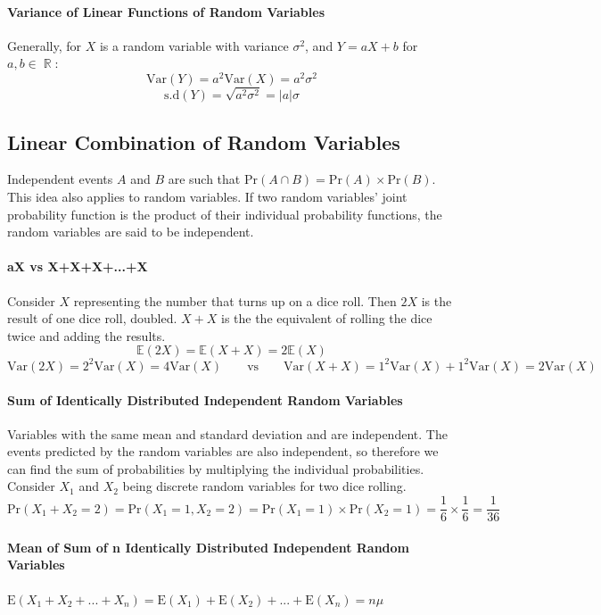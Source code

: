 \documentclass[a4paper,twoside]{article}
\DeclareMathOperator\R{\mathbb{R}}
\newcommand{\E}{\mathbb{E}}
\begin{document}
			\paragraph{Variance of Linear Functions of Random Variables} Generally, for $X$ is a random variable with variance $\sigma^2$, and $Y=aX+b$ for $a,b\in\R$:
			\[
				\mathrm{Var}(Y)=a^2\mathrm{Var}(X)=a^2\sigma^2
			\]
			\[
				\mathrm{s.d}(Y)=\sqrt{a^2\sigma^2}=|a|\sigma
			\]
		\subsection{Linear Combination of Random Variables}
			Independent events $A$ and $B$ are such that $\mathrm{Pr}(A\cap B)=\mathrm{Pr}(A)\times\mathrm{Pr}(B)$. This idea also applies to random variables. If two random variables' joint probability function is the product of their individual probability functions, the random variables are said to be independent.
			
			\paragraph{aX vs X+X+X+...+X} Consider $X$ representing the number that turns up on a dice roll. Then $2X$ is the result of one dice roll, doubled. $X+X$ is the the equivalent of rolling the dice twice and adding the results.
			\[
				\E(2X)=\E(X+X)=2\E(X)
			\]
			\[
				\mathrm{Var}(2X)=2^2\mathrm{Var}(X)=4\mathrm{Var}(X) \qquad \text{vs} \qquad \mathrm{Var}(X+X)=1^2\mathrm{Var}(X)+1^2\mathrm{Var}(X)=2\mathrm{Var}(X)
			\]
			
			\paragraph{Sum of Identically Distributed Independent Random Variables} Variables with the same mean and standard deviation and are independent. The events predicted by the random variables are also independent, so therefore we can find the sum of probabilities by multiplying the individual probabilities. Consider $X_1$ and $X_2$ being discrete random variables for two dice rolling.
			\[
				\mathrm{Pr}(X_1+X_2=2)=\mathrm{Pr}(X_1=1,X_2=2)=\mathrm{Pr}(X_1=1)\times\mathrm{Pr}(X_2=1)=\frac{1}{6}\times\frac{1}{6}=\frac{1}{36}
			\]
			
			\paragraph{Mean of Sum of n Identically Distributed Independent Random Variables} $\displaystyle\mathrm{E}(X_1+X_2+...+X_n)=\mathrm{E}(X_1)+\mathrm{E}(X_2)+...+\mathrm{E}(X_n)=n\mu$
			
\end{document}
